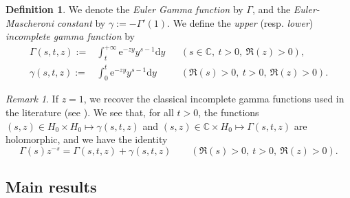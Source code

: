 \documentclass[a4paper]{amsart}
\theoremstyle{remark}
\newtheorem{remark}[theorem]{Remark}
\theoremstyle{definition}
\newtheorem{definition}[theorem]{Definition}
\newcommand{\dd}{\mathrm{d}}
\newcommand{\phie}{\mathrm{e}}
\begin{document}
\begin{definition}
\label{def:incomplete_gamma_function}
We denote the \textit{Euler Gamma function} by $\Gamma$, and the \textit{Euler-Mascheroni constant} by $\gamma:=-\Gamma'(1)$. We define the \textit{upper} (resp. \textit{lower}) \textit{incomplete gamma function} by
\begin{align*}
    \Gamma(s,t,z) :=& \int_{t}^{+\infty} \phie^{-z y} y^{s-1} \dd y &&(s \in \mathbb{C}, \ t>0, \ \Re(z)>0), \\
    \gamma(s,t,z) :=& \int_0^{t} \phie^{-z y} y^{s-1} \dd y &&(\Re(s)>0, \ t>0, \ \Re(z)>0).
\end{align*}
\end{definition}

\begin{remark}
If $z = 1$, we recover the classical incomplete gamma functions used in the literature (see \cite[Chap.IX]{bateman1953higher}). We see that, for all $t>0$, the functions $(s,z) \in H_0 \times H_0 \mapsto \gamma(s,t,z)$ and $(s,z) \in \mathbb{C} \times H_0 \mapsto \Gamma(s,t,z)$ are holomorphic, and we have the identity
\begin{equation}
    \Gamma(s)z^{-s} = \Gamma(s,t,z) + \gamma(s,t,z) \qquad (\Re(s)>0, \ t>0, \ \Re(z)>0). \label{eq:relation_incomplete_gamma_functions}
\end{equation}
\end{remark}

\subsection{Main results}
\end{document}

